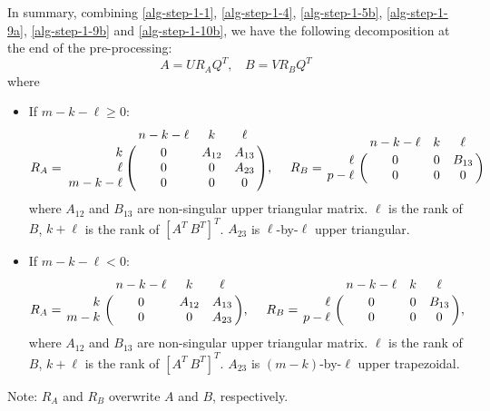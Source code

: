 In summary, combining \eqref{alg-step-1-1}, \eqref{alg-step-1-4}, \eqref{alg-step-1-5b}, \eqref{alg-step-1-9a}, \eqref{alg-step-1-9b} and \eqref{alg-step-1-10b}, we have the following decomposition at the end of the pre-processing: 
\begin{equation} \label{eq-alg-1}
A = UR_{A}Q^{T},\ \ \ \ B = VR_{B}Q^{T}
\end{equation}
where
\begin{itemize}
\item If $m-k-\ell \geq 0$: 
\[
R_{A} = \bordermatrix{ & n-k-\ell & k & \ell \cr
\hfill k & 0 & A_{12} & A_{13} \cr
\hfill \ell & 0 & 0 & A_{23} \cr
\hfill m-k-\ell & 0 & 0 & 0}, \  \ \ \
R_{B} = \bordermatrix{ & n-k-\ell & k & \ell   \cr
\hfill \ell & 0 & 0 & B_{13}\cr
\hfill p-\ell & 0 & 0 & 0}
\]
where $A_{12}$ and $B_{13}$ are non-singular upper triangular matrix. 
$\ell$ is the rank of $B$, $k+\ell$ is the rank of $[A^T \ B^T]^T$. 
$A_{23}$ is $\ell$-by-$\ell$ upper triangular.

\item If $m-k-\ell < 0$:
\[
R_{A} = \bordermatrix{ & n-k-\ell & k & \ell \cr
\hfill k & 0 & A_{12} & A_{13} \cr
\hfill m-k & 0 & 0 & A_{23}}, \  \ \ \
R_{B} = \bordermatrix{ & n-k-\ell & k & \ell   \cr
\hfill \ell & 0 & 0 & B_{13}\cr
\hfill p-\ell & 0 & 0 & 0}, 
\]
where $A_{12}$ and $B_{13}$ are non-singular upper triangular matrix. 
$\ell$ is the rank of $B$, $k+\ell$ is the rank of $[A^T \ B^T]^T$. 
$A_{23}$ is $(m-k)$-by-$\ell$ upper trapezoidal. 
\end{itemize}        
Note: $R_A$ and $R_B$ overwrite $A$ and $B$, respectively.

